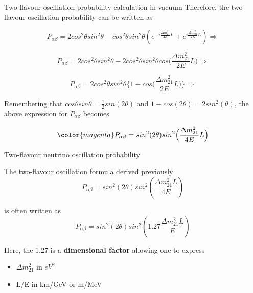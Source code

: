 {\begin{frame}{Two-flavour oscillation probability calculation in vacuum}
Therefore, the two-flavour oscillation probability can be written as

\begin{equation*}
     P_{\alpha \beta} =
      2 cos^2\theta sin^2\theta -
      cos^2\theta sin^2\theta
      (e^{-i \frac{\Delta m^{2}_{21}}{2E}L} +
       e^{ i \frac{\Delta m^{2}_{21}}{2E}L})
     \Rightarrow
\end{equation*}

\begin{equation*}
     P_{\alpha \beta} =
      2 cos^2\theta sin^2\theta -
      2 cos^2\theta sin^2\theta cos\Big(\frac{\Delta m^{2}_{21}}{2E}L\Big)
     \Rightarrow
\end{equation*}

\begin{equation*}
     P_{\alpha \beta} =
      2 cos^2\theta sin^2\theta \Big\{1 - cos\Big(\frac{\Delta m^{2}_{21}}{2E}L\Big)\Big\}
     \Rightarrow
\end{equation*}


Remembering that $cos\theta sin\theta = \frac{1}{2}sin(2\theta)$ and
$1-cos(2\theta)=2sin^{2}(\theta)$, the above expression for $P_{\alpha \beta}$ becomes

\begin{equation*}
{\color{magenta}
  P_{\alpha \beta} = sin^{2} (2\theta) sin^2\Big(\frac{\Delta m^{2}_{21}}{4E}L\Big)
}
\end{equation*}

\end{frame}


%
%
%

\begin{frame}{Two-flavour neutrino oscillation probability}

  The two-flavour oscillation formula derived previously
  \begin{equation*}
       P_{\alpha \beta} = sin^{2} (2\theta) sin^2(\frac{\Delta m^{2}_{21}L}{4E})
  \end{equation*}

  is often written as
  \begin{equation*}
       P_{\alpha \beta} = sin^{2} (2\theta) sin^2(1.27 \frac{\Delta m^{2}_{21}L}{E})
  \end{equation*}

  \vspace{0.3cm}

  Here, the 1.27 is a {\bf dimensional factor} allowing one to express
  \begin{itemize}
    \item $\Delta m^{2}_{21}$ in $eV^{2}$
    \item L/E in km/GeV or m/MeV
  \end{itemize}
\end{frame}

} %

